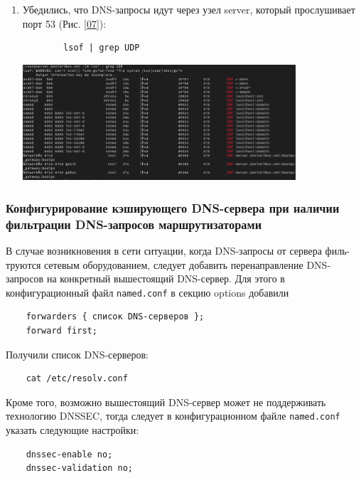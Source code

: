 \begin{enumerate}
    \item Убедились, что DNS-запросы идут через узел server, который прослушивает порт 53 (Рис. \ref{07}):
        \begin{verbatim}
        lsof | grep UDP
        \end{verbatim}

\begin{center}
    \centering
    \includegraphics[width=0.8\textwidth]{../images/image07.png}
    \label{07}
\end{center}

\end{enumerate}

\subsubsection{Конфигурирование кэширующего DNS-сервера при наличии фильтрации DNS-запросов маршрутизаторами}
В случае возникновения в сети ситуации, когда DNS-запросы от сервера филь- труются сетевым оборудованием, следует добавить перенаправление DNS-запросов на конкретный вышестоящий DNS-сервер. Для этого в конфигурационный файл {\tt named.conf} в секцию options добавили
        \begin{verbatim}
    forwarders { список DNS-серверов };
    forward first;
        \end{verbatim}
Получили список DNS-серверов:
        \begin{verbatim}
    cat /etc/resolv.conf
        \end{verbatim}
Кроме того, возможно вышестоящий DNS-сервер может не поддерживать технологию DNSSEC, тогда следует в конфигурационном файле {\tt named.conf} указать следующие настройки:
        \begin{verbatim}
    dnssec-enable no;
    dnssec-validation no;
        \end{verbatim}

